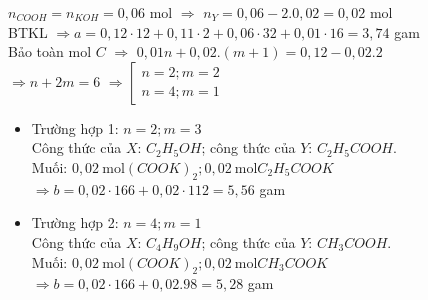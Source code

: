 \begin{vd}
{\begin{itemize}
			$n_{COOH}=n_{KOH}=0,06$ mol $\Rightarrow$ $n_Y=0,06-2.0,02=0,02$ mol
			\\
			BTKL $\Rightarrow a=0,12\cdot 12+0,11\cdot 2+0,06\cdot 32+0,01\cdot 16=3,74$ gam
			\\
			Bảo toàn mol $C$ $\Rightarrow$ $0,01n+0,02.(m+1)=0,12-0,02.2$
			\\
			$\Rightarrow n+2m=6$
			$\Rightarrow\left[\begin{array}{l}n=2; m=2\\ n=4; m=1\end{array}\right.$
			\begin{itemize}
				\item Trường hợp 1: $n=2; m=3$
				\\
				Công thức của $X$: $C_2 H_5 OH$; công thức của $Y$: $C_2 H_5 COOH$.
				\\
				Muối: $0,02\mathrm{~mol}(COOK)_2; 0,02\mathrm{~mol} C_2 H_5 COOK$
				\\
				$\Rightarrow b=0,02\cdot 166+0,02\cdot 112=5,56$ gam
				\item Trường hợp 2: $n=4; m=1$
				\\
				Công thức của $X$: $C_4 H_9 OH$; công thức của $Y$: $CH_3 COOH$.
				\\
				Muối: $0,02\mathrm{~mol}(COOK)_2; 0,02\mathrm{~mol} CH_3 COOK$
				\\
				$\Rightarrow b=0,02\cdot 166+0,02.98=5,28$ gam
			\end{itemize}
		\end{itemize}
	}
\end{vd}
